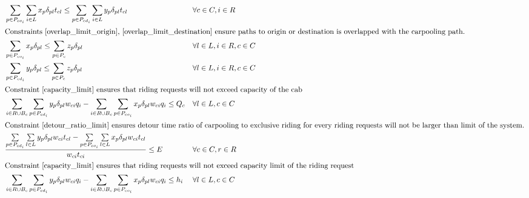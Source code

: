 \begin{align}
  & \sum\limits_{p \in P_{co_i}} \sum\limits_{i \in L} x_{p} \delta_{pl} t_{cl} \leq \sum\limits_{p \in P_{cd_i}} \sum\limits_{i \in L} y_{p} \delta_{pl} t_{cl} && \forall c \in C, i \in R \label{pick_up_drop_off_limit} \\
  \intertext{Constraints \eqref{overlap_limit_origin}, \eqref{overlap_limit_destination} ensure paths to origin or destination is overlapped with the carpooling path. }
  & \sum\limits_{p \in P_{co_i}} x_{p} \delta_{pl} \leq \sum\limits_{p \in P_{c}} z_{p} \delta_{pl} && \forall l \in L, i \in R, c \in C \label{overlap_limit_origin} \\
  & \sum\limits_{p \in P_{cd_i}} y_{p} \delta_{pl} \leq \sum\limits_{p \in P_{c}} z_{p} \delta_{pl} && \forall l \in L, i \in R, c \in C \label{overlap_limit_destination} \\
  \intertext{Constraint \eqref{capacity_limit} ensures that riding requests will not exceed capacity of the cab}
  & \sum\limits_{i \in R \cup B_c} \sum\limits_{p \in P_{cd_i}} y_{p} \delta_{pl} w_{ci} q_i - \sum\limits_{i \in R \cup B_c} \sum\limits_{p \in P_{co_i}} x_{p} \delta_{pl} w_{ci} q_i \leq Q_c && \forall l \in L, c \in C \label{capacity_limit} \\
  \intertext{Constraint \eqref{detour_ratio_limit} ensures detour time ratio of carpooling to exclusive riding for every riding requests will not be larger than limit of the system.}
  & \frac{\sum\limits_{p \in P_{cd_i}} \sum\limits_{l \in L} y_{p} \delta_{pl} w_{ci} t_{cl} - \sum\limits_{p \in P_{co_i}} \sum\limits_{l \in L} x_{p} \delta_{pl} w_{ci} t_{cl}}{w_{ci} t_{ci}} \leq E && \forall c \in C, r \in R \label{detour_ratio_limit} \\
  \intertext{Constraint \eqref{capacity_limit} ensures that riding requests will not exceed capacity limit of the riding request}
  & \sum\limits_{i \in R \cup B_c} \sum\limits_{p \in P_{cd_i}} y_{p} \delta_{pl} w_{ci} q_i - \sum\limits_{i \in R \cup B_c} \sum\limits_{p \in P_{co_i}} x_{p} \delta_{pl} w_{ci} q_i \leq h_i && \forall l \in L, c \in C \label{custom_capacity_limit} \\
\end{align}
